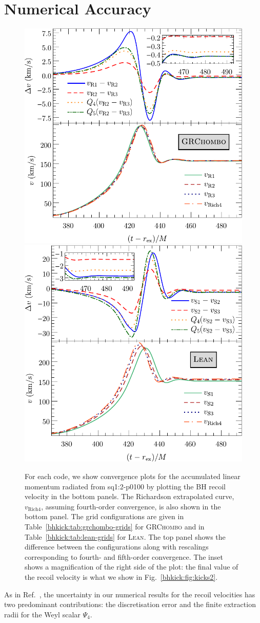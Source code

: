 


\section{Numerical Accuracy}
\label{bhkick:sec:accuracy}
\begin{figure}[t]
    \subfloat%
    {
        \includegraphics[width=0.48\linewidth]{bhkick/grchombo-convergence5.pdf}
    }
    \hfill
    \subfloat%
    {
        \includegraphics[width=0.48\linewidth]{bhkick/lean-convergence4.pdf}
    }
    \caption{For each code, we show convergence plots for the
      accumulated linear momentum radiated from \textsf{sq1:2-p0100}
      by plotting the BH recoil velocity in the bottom panels. The
      Richardson extrapolated curve, $v_{\mathrm{Rich4}}$, assuming
      fourth-order convergence, is also shown in the bottom panel. The
      grid configurations are given in Table~\ref{bhkick:tab:grchombo-grids}
      for \textsc{GRChombo} and in Table~\ref{bhkick:tab:lean-grids} for
      \textsc{Lean}. The top panel shows the difference between the
      configurations along with rescalings corresponding to fourth- and
      fifth-order convergence. The inset shows a magnification of the
      right side of the plot: the final value of the recoil
      velocity is what we show in Fig.~\ref{bhkick:fig:kicks2}.}
    \label{bhkick:fig:convergence}
\end{figure}
As in Ref.~\cite{Sperhake:2019wwo}, the uncertainty in our numerical results
for the recoil velocities has two predominant contributions: the
discretisation error and the finite extraction radii for the Weyl scalar
$\Psi_4$.

